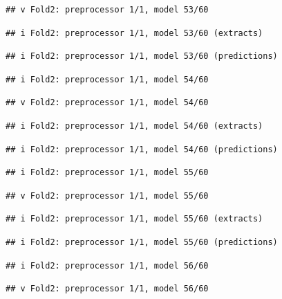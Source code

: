 \documentclass[
]{article}
\begin{document}
\begin{verbatim}
## v Fold2: preprocessor 1/1, model 53/60
\end{verbatim}

\begin{verbatim}
## i Fold2: preprocessor 1/1, model 53/60 (extracts)
\end{verbatim}

\begin{verbatim}
## i Fold2: preprocessor 1/1, model 53/60 (predictions)
\end{verbatim}

\begin{verbatim}
## i Fold2: preprocessor 1/1, model 54/60
\end{verbatim}

\begin{verbatim}
## v Fold2: preprocessor 1/1, model 54/60
\end{verbatim}

\begin{verbatim}
## i Fold2: preprocessor 1/1, model 54/60 (extracts)
\end{verbatim}

\begin{verbatim}
## i Fold2: preprocessor 1/1, model 54/60 (predictions)
\end{verbatim}

\begin{verbatim}
## i Fold2: preprocessor 1/1, model 55/60
\end{verbatim}

\begin{verbatim}
## v Fold2: preprocessor 1/1, model 55/60
\end{verbatim}

\begin{verbatim}
## i Fold2: preprocessor 1/1, model 55/60 (extracts)
\end{verbatim}

\begin{verbatim}
## i Fold2: preprocessor 1/1, model 55/60 (predictions)
\end{verbatim}

\begin{verbatim}
## i Fold2: preprocessor 1/1, model 56/60
\end{verbatim}

\begin{verbatim}
## v Fold2: preprocessor 1/1, model 56/60
\end{verbatim}
\end{document}
